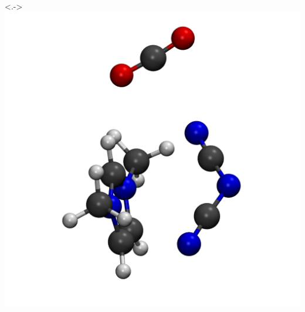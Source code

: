 \documentclass[xcolor=usenames,dvipsnames,svgnames]{beamer}
\begin{document}
\begin{frame}
  \begin{columns}
    \uncover<.->{\includegraphics[scale=0.08]{./figures/cluster_DCA.png}}

\end{columns}
\end{frame}
\end{document}
